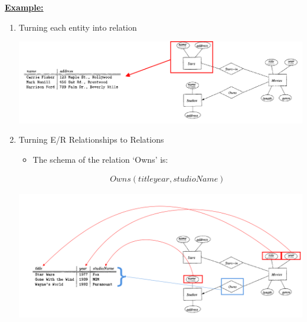 \documentclass[12pt]{article}
\begin{document}
\begin{enumerate}[1.]
\begin{itemize}
\begin{itemize}
            \bigskip

            \underline{\textbf{Example:}}

            \bigskip

            \begin{enumerate}[1.]
                \item Turning each entity into relation

                \begin{center}
                \includegraphics[width=\linewidth]{images/worksheet_14_solution_69.png}
                \end{center}

                \item Turning E/R Relationships to Relations

                \begin{itemize}
                    \item The schema of the relation `Owns' is:

                    \begin{align*}
                        Owns(title year, studioName)
                    \end{align*}
                \end{itemize}

                \begin{center}
                \includegraphics[width=\linewidth]{images/worksheet_14_solution_70.png}
                \end{center}
            \end{enumerate}
        \end{itemize}


\end{itemize}
\end{enumerate}
\end{document}
